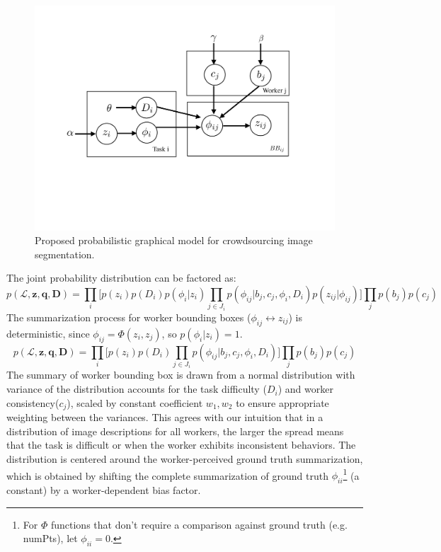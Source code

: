 \documentclass[12pt]{article}
\begin{document}
\begin{figure}[ht]
\centering
\includegraphics[trim=1cm 5cm 1cm 5cm,width=0.8\linewidth]{plots/generative_pgm2.pdf}
\caption{Proposed probabilistic graphical model for crowdsourcing image segmentation.}
\end{figure}
\par The joint probability distribution can be factored as:
\begin{equation}
p(\mathcal{L},\textbf{z},\textbf{q},\textbf{D}) = \prod_i \Big[p(z_i)p(D_i)p(\phi_i | z_i)\prod_{j\in J_i} p(\phi_{ij}|b_j,c_j,\phi_i,D_i)p(z_{ij}|\phi_{ij})\Big]\prod_j p(b_j) p(c_j) 
\end{equation}
The summarization process for worker bounding boxes ($\phi_{ij}\leftrightarrow z_{ij}$) is deterministic, since $\phi_{ij}=\Phi(z_i,z_j)$, so $p(\phi_i | z_i)=1$.
\begin{equation}
p(\mathcal{L},\textbf{z},\textbf{q},\textbf{D}) = \prod_i \Big[p(z_i)p(D_i)\prod_{j\in J_i} p(\phi_{ij}|b_j,c_j,\phi_i,D_i)\Big]\prod_j p(b_j) p(c_j) 
\end{equation}
The summary of worker bounding box is drawn from a normal distribution with variance of the distribution accounts for the task difficulty ($D_i$) and worker consistency($c_j$), scaled by constant coefficient $w_1,w_2$ to ensure appropriate weighting between the variances. This agrees with our intuition that in a distribution of image descriptions for all workers, the larger the spread means that the task is difficult or when the worker exhibits inconsistent behaviors. The distribution is centered around the worker-perceived ground truth summarization, which is obtained by shifting the complete summarization of ground truth $\phi_{ii}$\footnote{For $\Phi$ functions that don't require a comparison against ground truth (e.g. numPts), let $\phi_{ii}=0$. } (a constant) by a worker-dependent bias factor.
\end{document}
